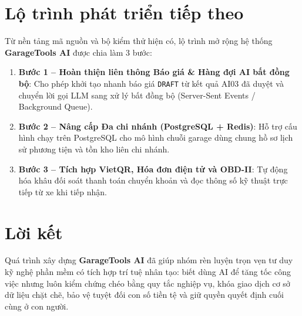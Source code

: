 \section{Lộ trình phát triển tiếp theo}

Từ nền tảng mã nguồn và bộ kiểm thử hiện có, lộ trình mở rộng hệ thống \textbf{GarageTools AI} được chia làm 3 bước:
\begin{enumerate}[noitemsep,topsep=2pt]
  \item \textbf{Bước 1 -- Hoàn thiện liên thông Báo giá \& Hàng đợi AI bất đồng bộ}: Cho phép khởi tạo nhanh báo giá \texttt{DRAFT} từ kết quả AI03 đã duyệt và chuyển lời gọi LLM sang xử lý bất đồng bộ (Server-Sent Events / Background Queue).
  \item \textbf{Bước 2 -- Nâng cấp Đa chi nhánh (PostgreSQL + Redis)}: Hỗ trợ cấu hình chạy trên PostgreSQL cho mô hình chuỗi garage dùng chung hồ sơ lịch sử phương tiện và tồn kho liên chi nhánh.
  \item \textbf{Bước 3 -- Tích hợp VietQR, Hóa đơn điện tử và OBD-II}: Tự động hóa khâu đối soát thanh toán chuyển khoản và đọc thông số kỹ thuật trực tiếp từ xe khi tiếp nhận.
\end{enumerate}

\section{Lời kết}

Quá trình xây dựng \textbf{GarageTools AI} đã giúp nhóm rèn luyện trọn vẹn tư duy kỹ nghệ phần mềm có tích hợp trí tuệ nhân tạo: biết dùng AI để tăng tốc công việc nhưng luôn kiểm chứng chéo bằng quy tắc nghiệp vụ, khóa giao dịch cơ sở dữ liệu chặt chẽ, bảo vệ tuyệt đối con số tiền tệ và giữ quyền quyết định cuối cùng ở con người.
